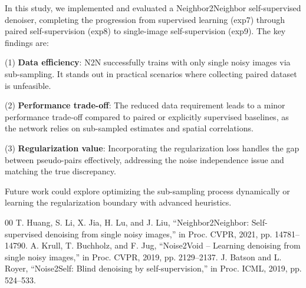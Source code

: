 \documentclass[twocolumn, a4paper, 10pt]{article}
\begin{document}
In this study, we implemented and evaluated a Neighbor2Neighbor self-supervised denoiser, completing the progression from supervised learning (exp7) through paired self-supervision (exp8) to single-image self-supervision (exp9). The key findings are:

(1) \textbf{Data efficiency}: N2N successfully trains with only single noisy images via sub-sampling. It stands out in practical scenarios where collecting paired dataset is unfeasible.

(2) \textbf{Performance trade-off}: The reduced data requirement leads to a minor performance trade-off compared to paired or explicitly supervised baselines, as the network relies on sub-sampled estimates and spatial correlations.

(3) \textbf{Regularization value}: Incorporating the regularization loss handles the gap between pseudo-pairs effectively, addressing the noise independence issue and matching the true discrepancy.

Future work could explore optimizing the sub-sampling process dynamically or learning the regularization boundary with advanced heuristics.

\begin{thebibliography}{00}
 T. Huang, S. Li, X. Jia, H. Lu, and J. Liu, ``Neighbor2Neighbor: Self-supervised denoising from single noisy images,'' in Proc. CVPR, 2021, pp. 14781--14790.
 A. Krull, T. Buchholz, and F. Jug, ``Noise2Void -- Learning denoising from single noisy images,'' in Proc. CVPR, 2019, pp. 2129--2137.
 J. Batson and L. Royer, ``Noise2Self: Blind denoising by self-supervision,'' in Proc. ICML, 2019, pp. 524--533.
\end{thebibliography}
\end{document}
